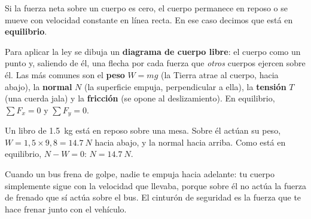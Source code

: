 \documentclass[11pt]{article}
\begin{document}
\begin{teorema}
Si la fuerza neta sobre un cuerpo es cero, el cuerpo permanece en reposo o se mueve con
velocidad constante en línea recta. En ese caso decimos que está en \textbf{equilibrio}.
\end{teorema}

Para aplicar la ley se dibuja un \textbf{diagrama de cuerpo libre}: el cuerpo como un punto y,
saliendo de él, una flecha por cada fuerza que \emph{otros} cuerpos ejercen sobre él. Las más
comunes son el \textbf{peso} $W = mg$ (la Tierra atrae al cuerpo, hacia abajo), la
\textbf{normal} $N$ (la superficie empuja, perpendicular a ella), la \textbf{tensión} $T$ (una
cuerda jala) y la \textbf{fricción} (se opone al deslizamiento). En equilibrio, $\sum F_x = 0$
y $\sum F_y = 0$.

\begin{ejemplo}
Un libro de \qty{1,5}{kg} está en reposo sobre una mesa. Sobre él actúan su peso,
$W = 1{,}5 \times 9{,}8 = \qty{14,7}{N}$ hacia abajo, y la normal hacia arriba. Como está en
equilibrio, $N - W = 0$: $N = \qty{14,7}{N}$.
\begin{center}
\end{center}
\end{ejemplo}

\begin{aplicacion}
Cuando un bus frena de golpe, nadie te empuja hacia adelante: tu cuerpo simplemente sigue con
la velocidad que llevaba, porque sobre él no actúa la fuerza de frenado que sí actúa sobre el
bus. El cinturón de seguridad es la fuerza que te hace frenar junto con el vehículo.
\end{aplicacion}
\end{document}
